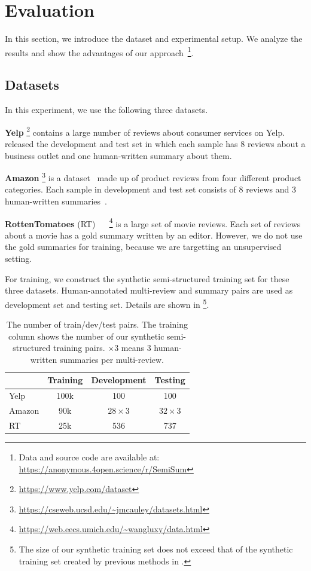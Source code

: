 \section{Evaluation}
\label{sec:eval}
In this section, we introduce the dataset and experimental setup. We analyze the results and show the advantages of our approach~\footnote{Data and source code are available at: \url{https://anonymous.4open.science/r/SemiSum}}.

\subsection{Datasets}
In this experiment, we use the following three datasets.

\textbf{Yelp} 
\footnote{\url{https://www.yelp.com/dataset}}
contains a large number of reviews about consumer services on Yelp. 
\citet{MeanSum19} released the development and test set in which each sample 
has 8 reviews about a business outlet and one human-written summary about them.

\textbf{Amazon} 
\footnote{\url{https://cseweb.ucsd.edu/~jmcauley/datasets.html}}
is a dataset~\cite{HeM16} made up of product reviews from four different product categories. 
Each sample in development and test set consists of 8 reviews and 3 human-written summaries~\cite{Copycat20}. 

\textbf{RottenTomatoes} (RT) ~\cite{RT16}
~\footnote{\url{https://web.eecs.umich.edu/~wangluxy/data.html}}
is a large set of movie reviews. Each set of reviews about a
movie has a gold summary written by an editor. However, we do not use the gold summaries for training, 
because we are targetting an unsupervised setting.

For training, we construct the synthetic semi-structured training set for these three datasets.
Human-annotated multi-review and summary pairs
are used as development set and testing set.  
Details are shown in 
\footnote{The size of our synthetic training set does not exceed that of the synthetic training set created by previous methods in .}.

\begin{table}[th]
	\small
	\centering
	\begin{tabular}{|l|c|c|c|}
		\hline
		\textbf{} & \textbf{Training} &\textbf{Development} & \textbf{Testing}\\
		\hline
		Yelp & 100k & 100 & 100 \\
		Amazon & 90k & $28\times3$ & $32\times3$ \\
		RT & 25k& 536 & 737\\
		\hline
	\end{tabular}
	\caption{%
		The number of  train/dev/test pairs. 
		The training column shows the number of our synthetic semi-structured training pairs.
		$\times3$ means 3 human-written summaries per multi-review.}
	\label{tab:datasets}
\end{table}


